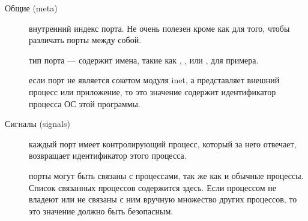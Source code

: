 \begin{description*}
\item[Общие (meta)] \hfill
\begin{description}		
	\item[] внутренний индекс порта. Не очень полезен кроме как для того, чтобы различать порты между собой.
	
	\item[] тип порта --- содержит имена, такие как , , или , для примера.
	
	\item[] если порт не является сокетом модуля inet, а представляет внешний процесс или приложение, то это значение содержит идентификатор процесса ОС этой программы.
\end{description}

\item[Сигналы (signals)] \hfill
\begin{description}		
	\item[] каждый порт имеет контролирующий процесс, который за него отвечает,  возвращает идентификатор этого процесса.
	
	\item[] порты могут быть связаны с процессами, так же как и обычные процессы. Список связанных процессов содержится здесь. Если процессом не владеют или не связаны с ним вручную множество других процессов, то это значение должно быть безопасным.
	

\end{description}
\end{description*}
